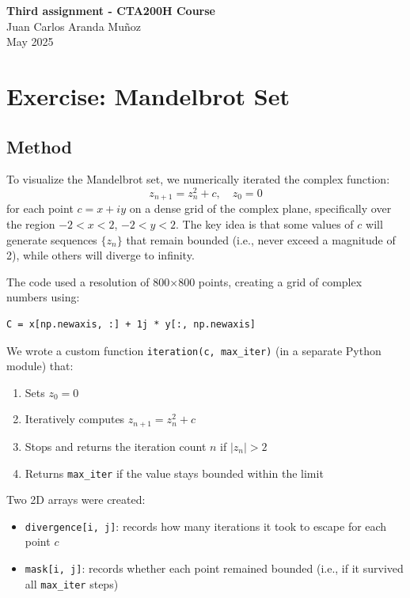 \documentclass[12pt]{article}
\begin{document}
\begin{center}
    \vspace*{1cm}
    \Large \textbf{Third assignment - CTA200H Course} \\[0.5cm]
    \large Juan Carlos Aranda Muñoz \\[0.2cm]
    \normalsize May 2025
    \vspace{1cm}
\end{center}
\renewcommand{\arraystretch}{1.2} %

\section{Exercise: Mandelbrot Set}

\subsection*{Method}
To visualize the Mandelbrot set, we numerically iterated the complex function:
\[
z_{n+1} = z_n^2 + c, \quad z_0 = 0
\]
for each point \( c = x + iy \) on a dense grid of the complex plane, specifically over the region \( -2 < x < 2 \), \( -2 < y < 2 \). The key idea is that some values of \( c \) will generate sequences \( \{z_n\} \) that remain bounded (i.e., never exceed a magnitude of 2), while others will diverge to infinity.

The code used a resolution of 800×800 points, creating a grid of complex numbers using:
\begin{verbatim}
C = x[np.newaxis, :] + 1j * y[:, np.newaxis]
\end{verbatim}
We wrote a custom function \texttt{iteration(c, max\_iter)} (in a separate Python module) that:
\begin{enumerate}
    \item Sets \( z_0 = 0 \)
    \item Iteratively computes \( z_{n+1} = z_n^2 + c \)
    \item Stops and returns the iteration count \( n \) if \( |z_n| > 2 \)
    \item Returns \texttt{max\_iter} if the value stays bounded within the limit
\end{enumerate}

\noindent Two 2D arrays were created:
\begin{itemize}
    \item \texttt{divergence[i, j]}: records how many iterations it took to escape for each point \( c \)
    \item \texttt{mask[i, j]}: records whether each point remained bounded (i.e., if it survived all \texttt{max\_iter} steps)
\end{itemize}
\end{document}
